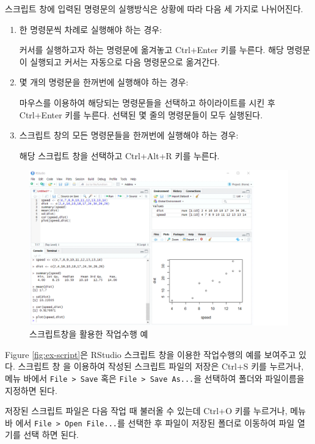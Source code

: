 \documentclass[
]{book}
\begin{document}
스크립트 창에 입력된 명령문의 실행방식은 상황에 따라 다음 세 가지로
나뉘어진다.

\begin{enumerate}
\def\labelenumi{\arabic{enumi}.}
\item
  한 명령문씩 차례로 실행해야 하는 경우:

  커서를 실행하고자 하는 명령문에 옮겨놓고 Ctrl+Enter 키를 누른다.
  해당 명령문이 실행되고 커서는 자동으로 다음 명령문으로 옮겨간다.
\item
  몇 개의 명령문을 한꺼번에 실행해야 하는 경우:

  마우스를 이용하여 해당되는 명령문들을 선택하고 하이라이트를 시킨 후
  Ctrl+Enter 키를 누른다. 선택된 몇 줄의 명령문들이 모두 실행된다.
\item
  스크립트 창의 모든 명령문들을 한꺼번에 실행해야 하는 경우:

  해당 스크립트 창을 선택하고 Ctrl+Alt+R 키를 누른다.
\end{enumerate}

\begin{figure}
\hypertarget{ex-script}{%
\centering
\includegraphics[width=5.20833in,height=\textheight]{Figure/ex_script.png}
\caption{스크립트창을 활용한 작업수행
예}\label{ex-script}
}
\end{figure}

Figure \ref{fig:ex-script}은 RStudio 스크립트 창을 이용한 작업수행의
예를 보여주고 있다. 스크립트 창 을 이용하여 작성된 스크립트 파일의
저장은 Ctrl+S 키를 누르거나, 메뉴 바에서 \texttt{File\ \textgreater{}\ Save} 혹은
\texttt{File\ \textgreater{}\ Save\ As...}을 선택하여 폴더와 파일이름을 지정하면 된다.

저장된 스크립트 파일은 다음 작업 때 불러올 수 있는데 Ctrl+O 키를
누르거나, 메뉴 바 에서 \texttt{File\ \textgreater{}\ Open\ File...}를 선택한 후 파일이 저장된
폴더로 이동하여 파일 열기를 선택 하면 된다.
\end{document}
